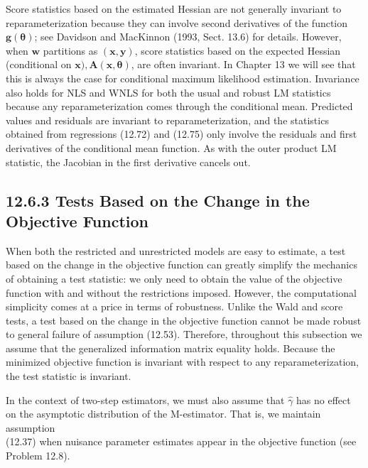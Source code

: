 \documentclass[10pt]{article}
\begin{document}
Score statistics based on the estimated Hessian are not generally invariant to reparameterization because they can involve second derivatives of the function $\mathbf{g}(\boldsymbol{\theta})$; see Davidson and MacKinnon (1993, Sect. 13.6) for details. However, when $\mathbf{w}$ partitions as $(\mathbf{x}, \mathbf{y})$, score statistics based on the expected Hessian (conditional on $\mathbf{x}), \mathbf{A}(\mathbf{x}, \boldsymbol{\theta})$, are often invariant. In Chapter 13 we will see that this is always the case for conditional maximum likelihood estimation. Invariance also holds for NLS and WNLS for both the usual and robust LM statistics because any reparameterization comes through the conditional mean. Predicted values and residuals are invariant to reparameterization, and the statistics obtained from regressions (12.72) and (12.75) only involve the residuals and first derivatives of the conditional mean function. As with the outer product LM statistic, the Jacobian in the first derivative cancels out.

\subsection*{12.6.3 Tests Based on the Change in the Objective Function}
When both the restricted and unrestricted models are easy to estimate, a test based on the change in the objective function can greatly simplify the mechanics of obtaining a test statistic: we only need to obtain the value of the objective function with and without the restrictions imposed. However, the computational simplicity comes at a price in terms of robustness. Unlike the Wald and score tests, a test based on the change in the objective function cannot be made robust to general failure of assumption (12.53). Therefore, throughout this subsection we assume that the generalized information matrix equality holds. Because the minimized objective function is invariant with respect to any reparameterization, the test statistic is invariant.

In the context of two-step estimators, we must also assume that $\hat{\gamma}$ has no effect on the asymptotic distribution of the M-estimator. That is, we maintain assumption\\
(12.37) when nuisance parameter estimates appear in the objective function (see Problem 12.8).
\end{document}

